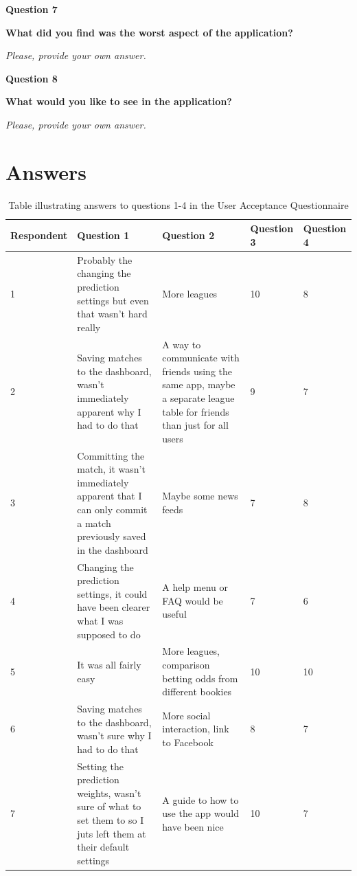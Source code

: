 \textbf{Question 7}\par
\textbf{What did you find was the worst aspect of the application?}\par
\emph{Please, provide your own answer.}

\textbf{Question 8}\par
\textbf{What would you like to see in the application?}\par
\emph{Please, provide your own answer.}

\section{Answers}
\label{sec:ua_answers_appendix}

\noindent
\begin{table}
\begin{tabular}{
  |p{}%
  |p{}%
  |p{}%
  |p{}%
  |p{}|%
  }
  \hline
  \centering Respondent  & \centering Question 1  & \centering Question 2 &  \centering Question 3 & \centering\arraybackslash Question 4   \\ \hline
  1  & Probably the changing the prediction settings but even that wasn't hard really & More leagues & 10 & 8 \\ \hline
  2 & Saving matches to the dashboard, wasn't immediately apparent why I had to do that & A way to communicate with friends using the same app, maybe a separate league table for friends than just for all users & 9 & 7 \\ \hline
  3 & Committing the match, it wasn't immediately apparent that I can only commit a match previously saved in the dashboard & Maybe some news feeds & 7 & 8 \\ \hline
  4 &  Changing the prediction settings, it could have been clearer what I was supposed to do & A help menu or FAQ would be useful & 7 & 6 \\ \hline
  5 &  It was all fairly easy & More leagues, comparison betting odds from different bookies & 10 & 10 \\ \hline
  6 &  Saving matches to the dashboard, wasn't sure why I had to do that & More social interaction, link to Facebook & 8 & 7 \\ \hline
  7 &  Setting the prediction weights, wasn't sure of what to set them to so I juts left them at their default settings & A guide to how to use the app would have been nice & 10 & 7 \\ \hline

  \end{tabular}
 \caption{Table illustrating answers to questions 1-4 in the User Acceptance Questionnaire}

\end{table}


